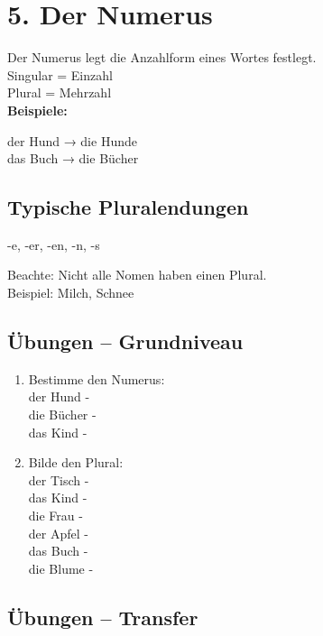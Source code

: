 \documentclass[a4paper,12pt]{article}
\begin{document}
\section*{5. Der Numerus}

Der Numerus legt die Anzahlform eines Wortes festlegt.\\
Singular = Einzahl\\
Plural = Mehrzahl\\  

\textbf{Beispiele:}

der Hund → die Hunde  \\
das Buch → die Bücher  

\subsection*{Typische Pluralendungen}

-e, -er, -en, -n, -s  

\begin{achtung}
Beachte: Nicht alle Nomen haben einen Plural.  \\
Beispiel: Milch, Schnee
\end{achtung}

\subsection*{Übungen – Grundniveau}

\begin{enumerate}
\item Bestimme den Numerus: \\
der Hund -\\
die Bücher -\\
das Kind - \\

\item Bilde den Plural:\\
der Tisch -\\
das Kind -\\
die Frau -\\
der Apfel -\\
das Buch -\\
die Blume -
\end{enumerate}

\subsection*{Übungen – Transfer}
\end{document}
